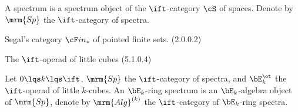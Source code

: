 \documentclass[a4paper, twoside]{article}
\begin{document}
\begin{dfn}[1.4.3.1]
    A spectrum is a spectrum object of the $\ift$-category $\cS$ of spaces. Denote by $\mrm{Sp}$ the $\ift$-category of spectra.
\end{dfn}



Segal's category $\cF in_{*}$ of pointed finite sets. (2.0.0.2)

The $\ift$-operad of little cubes (5.1.0.4)



\begin{dfn}[7.1.0.1]
    Let $0\lqs k\lqs \ift$, $\mrm{Sp}$ the $\ift$-category of spectra, and $\bE_{k}^{\ot}$ the $\ift$-operad of little $k$-cubes. An $\bE_{k}$-ring spectrum is an $\bE_{k}$-algebra object of $\mrm{Sp}$, denote by $\mrm{Alg}^{(k)}$ the $\ift$-category of $\bE_{k}$-ring spectra.
\end{dfn}



\printref
\end{document}
